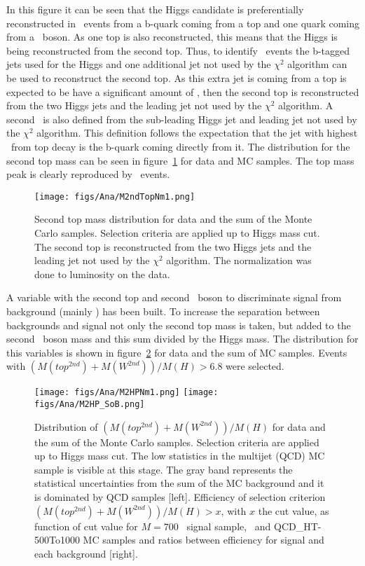 In this figure it can be seen that the Higgs candidate is preferentially reconstructed in \ttbar~events from a b-quark coming from a top and one quark coming from a \W~boson. As one top is also reconstructed, this means that the Higgs is being reconstructed from the second top. Thus, to identify \ttbar~events the b-tagged jets used for the Higgs and one additional jet not used by the $\chi^{2}$ algorithm can be used to reconstruct the second top. As this extra jet is coming from a top is expected to be have a significant amount of \pt, then the second top is reconstructed from the two Higgs jets and the leading jet not used by the $\chi^{2}$ algorithm. A second \W~is also defined from the sub-leading Higgs jet and leading jet not used by the $\chi^{2}$ algorithm. This definition follows the expectation that the jet with highest \pt~from top decay is the b-quark coming directly from it. The distribution for the second top mass can be seen in figure~\ref{fig:2ndTM} for data and MC samples. The top mass peak is clearly reproduced by \ttbar~events.

\begin{figure}[!Hhtbp]
  \begin{center}
    \texttt{[image: figs/Ana/M2ndTopNm1.png]}
    \caption{Second top mass distribution for data and the sum of the Monte Carlo samples. Selection criteria are applied up to Higgs mass cut. The second top is reconstructed from the two Higgs jets and the leading jet not used by the $\chi^{2}$ algorithm. The normalization was done to luminosity on the data.}
    \label{fig:2ndTM}
  \end{center}
\end{figure}

A variable with the second top and second \W~boson to discriminate signal from background (mainly \ttbar) has been built. To increase the separation between backgrounds and signal not only the second top mass is taken, but added to the second \W~boson mass and this sum divided by the Higgs mass. The distribution for this variables is shown in figure~\ref{fig:m2thp} for data and the sum of MC samples. Events with $(M(top^{2nd})+M(W^{2nd}))/M(H)>6.8$ were selected.

\begin{figure}[!Hhtbp]
  \begin{center}
    \texttt{[image: figs/Ana/M2HPNm1.png]}
    \texttt{[image: figs/Ana/M2HP\_SoB.png]}
    \caption{Distribution of $(M(top^{2nd})+M(W^{2nd}))/M(H)$ for data and the sum of the Monte Carlo samples. Selection criteria are applied up to Higgs mass cut. The low statistics in the multijet (QCD) MC sample is visible at this stage. The gray band represents the statistical uncertainties from the sum of the MC background and it is dominated by QCD samples [left]. Efficiency of selection criterion $(M(top^{2nd})+M(W^{2nd}))/M(H)>x$, with $x$ the cut value, as function of cut value for $M=700$ \GeVcc~signal sample, \ttbar~and QCD\_HT-500To1000 MC samples and ratios between efficiency for signal and each background [right].}
    \label{fig:m2thp}
  \end{center}
\end{figure}

